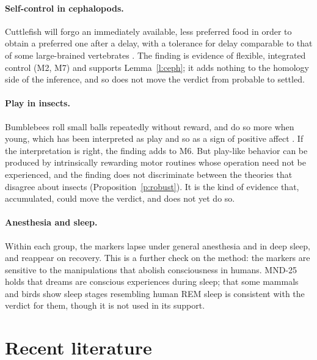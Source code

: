 \documentclass{situationist-preprint}
\begin{document}
\paragraph{Self-control in cephalopods.} Cuttlefish will forgo an immediately available, less preferred food in order to obtain a preferred one after a delay, with a tolerance for delay comparable to that of some large-brained vertebrates \citep{Schnell2021}. The finding is evidence of flexible, integrated control (M2, M7) and supports Lemma~\ref{l:ceph}; it adds nothing to the homology side of the inference, and so does not move the verdict from probable to settled.

\paragraph{Play in insects.} Bumblebees roll small balls repeatedly without reward, and do so more when young, which has been interpreted as play and so as a sign of positive affect \citep{Dona2022}. If the interpretation is right, the finding adds to M6. But play-like behavior can be produced by intrinsically rewarding motor routines whose operation need not be experienced, and the finding does not discriminate between the theories that disagree about insects (Proposition~\ref{p:robust}). It is the kind of evidence that, accumulated, could move the verdict, and does not yet do so.

\paragraph{Anesthesia and sleep.} Within each group, the markers lapse under general anesthesia and in deep sleep, and reappear on recovery. This is a further check on the method: the markers are sensitive to the manipulations that abolish consciousness in humans. MND-25 holds that dreams are conscious experiences during sleep; that some mammals and birds show sleep stages resembling human REM sleep is consistent with the verdict for them, though it is not used in its support.

\section{Recent literature}
\end{document}
